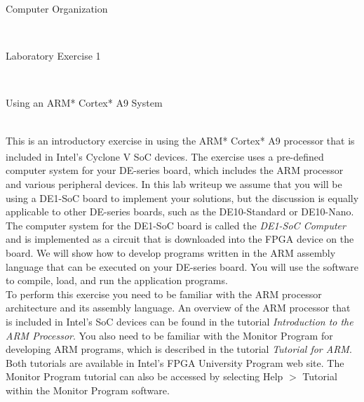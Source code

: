 \documentclass[epsfig,10pt,fullpage]{article}
\newcommand{\LabNum}{1}
\begin{document}
\centerline{\huge Computer Organization}
~\\
\centerline{\huge Laboratory Exercise \LabNum}
~\\
\centerline{\large Using an ARM* Cortex* A9 System}
~\\

\noindent
This is an introductory exercise in using the ARM* Cortex* A9 processor
that is included in Intel's Cyclone\textsuperscript{\textregistered} V SoC devices. The exercise uses a pre-defined computer 
system for your DE-series board, which includes the ARM processor and various peripheral devices.
In this lab writeup we assume that you will be using a DE1-SoC board to implement your
solutions, but the discussion is equally applicable to other DE-series boards, such as the 
DE10-Standard or DE10-Nano. The computer system for the DE1-SoC board is called the 
{\it DE1-SoC Computer} and is implemented as a circuit that is downloaded into the FPGA device 
on the board. We will show how to develop programs written in the ARM assembly language that can 
be executed on your DE-series board. You will use the {\it \productNameMedTM{}} software to compile,
load, and run the application programs. 
~\\

\noindent
To perform this exercise you need to be familiar with the ARM processor architecture and its 
assembly language. An overview of the ARM processor that is included in Intel's SoC devices
can be found in the tutorial {\it Introduction to the ARM Processor}. You also need to be 
familiar with the Monitor Program for developing ARM programs, which is described in 
the tutorial {\it \productNameMed{} Tutorial for ARM}.  Both tutorials are available in 
Intel's FPGA University Program web site. The Monitor Program tutorial can also be accessed by 
selecting {\sf Help $>$ Tutorial} within the Monitor Program software.
\end{document}
